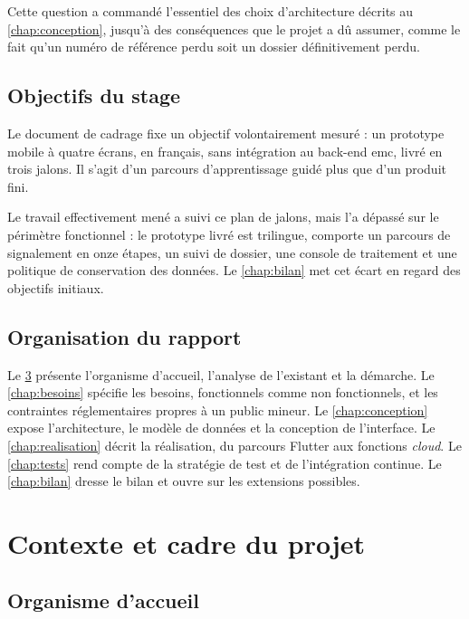 \documentclass[11pt,a4paper,oneside,openany]{report}
\begin{document}
Cette question a commandé l'essentiel des choix d'architecture décrits au
\cref{chap:conception}, jusqu'à des conséquences que le projet a dû assumer,
comme le fait qu'un numéro de référence perdu soit un dossier définitivement
perdu.

\section{Objectifs du stage}

Le document de cadrage fixe un objectif volontairement mesuré : un prototype
mobile à quatre écrans, en français, sans intégration au back-end \gls{emc},
livré en trois jalons. Il s'agit d'un parcours d'apprentissage guidé plus que
d'un produit fini.

Le travail effectivement mené a suivi ce plan de jalons, mais l'a dépassé sur le
périmètre fonctionnel : le prototype livré est trilingue, comporte un parcours de
signalement en onze étapes, un suivi de dossier, une console de traitement et
une politique de conservation des données. Le \cref{chap:bilan} met cet écart en
regard des objectifs initiaux.

\section{Organisation du rapport}

Le \cref{chap:contexte} présente l'organisme d'accueil, l'analyse de l'existant
et la démarche. Le \cref{chap:besoins} spécifie les besoins, fonctionnels comme
non fonctionnels, et les contraintes réglementaires propres à un public mineur.
Le \cref{chap:conception} expose l'architecture, le modèle de données et la
conception de l'interface. Le \cref{chap:realisation} décrit la réalisation, du
parcours Flutter aux fonctions \emph{cloud}. Le \cref{chap:tests} rend compte de
la stratégie de test et de l'intégration continue. Le \cref{chap:bilan} dresse le
bilan et ouvre sur les extensions possibles.

\chapter{Contexte et cadre du projet}
\label{chap:contexte}

\section{Organisme d'accueil}
\end{document}
